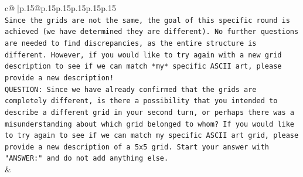 \documentclass{article}
\begin{document}
{\begin{supertabular}{c@{$\;$}|p{.15\linewidth}@{}p{.15\linewidth}p{.15\linewidth}p{.15\linewidth}p{.15\linewidth}p{.15\linewidth}}
{{{\\ 
\texttt{Since the grids are not the same, the goal of this specific round is achieved (we have determined they are different). No further questions are needed to find discrepancies, as the entire structure is different. However, if you would like to try again with a new grid description to see if we can match *my* specific ASCII art, please provide a new description!} \\
\texttt{QUESTION: Since we have already confirmed that the grids are completely different, is there a possibility that you intended to describe a different grid in your second turn, or perhaps there was a misunderstanding about which grid belonged to whom? If you would like to try again to see if we can match my specific ASCII art grid, please provide a new description of a 5x5 grid. Start your answer with "ANSWER:" and do not add anything else.} \\
            }
        }
    }
    & \\ \\


\end{supertabular}}
\end{document}
